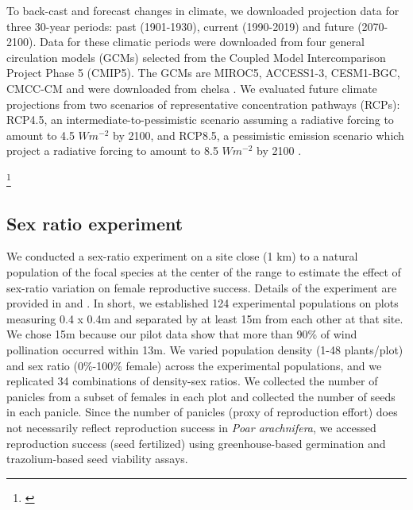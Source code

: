 \documentclass[11pt]{article}\usepackage[]{graphicx}\usepackage[usenames,dvipsnames]{xcolor}
\newcommand{\tom}[2]{{\color{red}{#1}}\footnote{\textit{\color{red}{#2}}}}
\begin{document}
To back-cast and forecast changes in climate, we downloaded projection data for three 30-year periods: past (1901-1930), current (1990-2019) and future (2070-2100).
Data for these climatic periods were downloaded from four general circulation models (GCMs) selected from the Coupled Model Intercomparison Project Phase 5 (CMIP5). 
The GCMs are MIROC5, ACCESS1-3, CESM1-BGC, CMCC-CM  and were downloaded from chelsa \citep{sanderson2015representative}.
We evaluated future climate projections from two scenarios of representative concentration pathways (RCPs): RCP4.5, an intermediate-to-pessimistic scenario assuming a radiative forcing to amount to 4.5 $W m^{-2}$ by 2100, and RCP8.5, a pessimistic emission scenario which project a radiative forcing to amount to 8.5 $W m^{-2}$ by 2100 \citep{thomson2011rcp4, schwalm2020rcp8}.

\tom{Tom stopped here Monday evening. Generall impressions: really good! Need more hypotheses regarding sex-specific responses. Also need to say a little more about prev study (including what is known about sex-specific niches), and lean into the natural history at the end of intro and start of methods. }{}

\subsection*{Sex ratio experiment}

We conducted a sex-ratio experiment on a site close (1 km) to a natural population of the focal species at the center of the range to estimate the effect of sex-ratio variation on female reproductive success.
Details of the experiment are provided in \cite{compagnoni2017can} and \cite{miller2022two}.
In short, we established 124 experimental populations on plots measuring 0.4 x 0.4m and separated by at least 15m from each other at that site. 
We chose 15m because our pilot data show that more than 90\% of wind pollination occurred within 13m. 
We varied population density (1-48 plants/plot) and sex ratio (0\%-100\% female) across the experimental populations, and we replicated 34 combinations of density-sex ratios. 
We collected the number of panicles from a subset of females in each plot and collected the number of seeds in each panicle.
Since the number of panicles (proxy of reproduction effort) does not necessarily reflect reproduction success in \textit{Poar arachnifera}, we accessed reproduction success (seed fertilized) using greenhouse-based germination and trazolium-based seed viability assays. 
\end{document}
